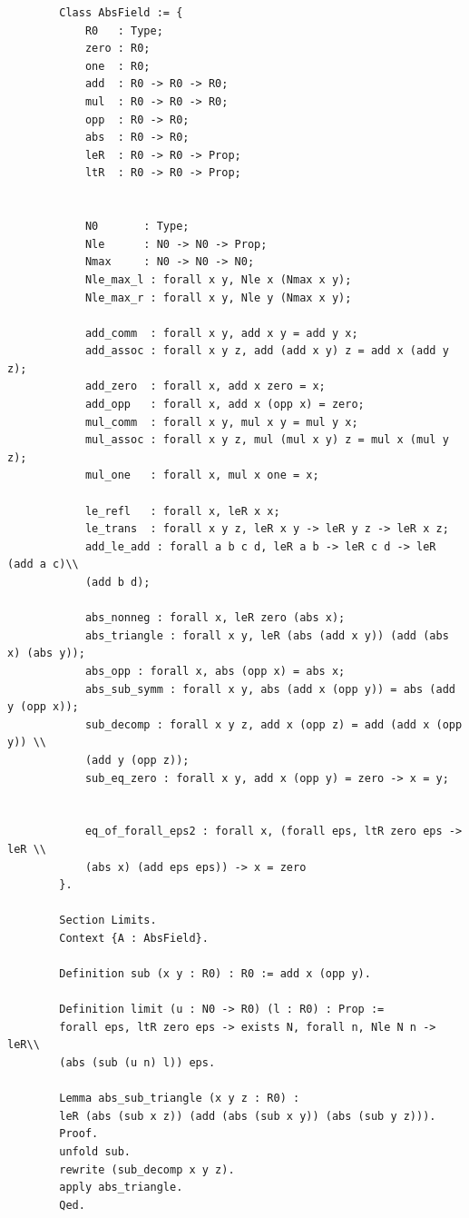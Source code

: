 \documentclass{article}
\theoremstyle{plain}
\theoremstyle{definition}
\theoremstyle{remark}
\begin{document}
	\begin{verbatim}
		Class AbsField := {
			R0   : Type;
			zero : R0;
			one  : R0;
			add  : R0 -> R0 -> R0;
			mul  : R0 -> R0 -> R0;
			opp  : R0 -> R0;
			abs  : R0 -> R0;
			leR  : R0 -> R0 -> Prop;
			ltR  : R0 -> R0 -> Prop;
			
			
			N0       : Type;
			Nle      : N0 -> N0 -> Prop;
			Nmax     : N0 -> N0 -> N0;
			Nle_max_l : forall x y, Nle x (Nmax x y);
			Nle_max_r : forall x y, Nle y (Nmax x y);
			
			add_comm  : forall x y, add x y = add y x;
			add_assoc : forall x y z, add (add x y) z = add x (add y z);
			add_zero  : forall x, add x zero = x;
			add_opp   : forall x, add x (opp x) = zero;
			mul_comm  : forall x y, mul x y = mul y x;
			mul_assoc : forall x y z, mul (mul x y) z = mul x (mul y z);
			mul_one   : forall x, mul x one = x;
			
			le_refl   : forall x, leR x x;
			le_trans  : forall x y z, leR x y -> leR y z -> leR x z;
			add_le_add : forall a b c d, leR a b -> leR c d -> leR (add a c)\\
			(add b d);
			
			abs_nonneg : forall x, leR zero (abs x);
			abs_triangle : forall x y, leR (abs (add x y)) (add (abs x) (abs y));
			abs_opp : forall x, abs (opp x) = abs x;
			abs_sub_symm : forall x y, abs (add x (opp y)) = abs (add y (opp x));
			sub_decomp : forall x y z, add x (opp z) = add (add x (opp y)) \\
			(add y (opp z));
			sub_eq_zero : forall x y, add x (opp y) = zero -> x = y;
			
			
			eq_of_forall_eps2 : forall x, (forall eps, ltR zero eps -> leR \\
			(abs x) (add eps eps)) -> x = zero
		}.
		
		Section Limits.
		Context {A : AbsField}.
		
		Definition sub (x y : R0) : R0 := add x (opp y).
		
		Definition limit (u : N0 -> R0) (l : R0) : Prop :=
		forall eps, ltR zero eps -> exists N, forall n, Nle N n -> leR\\
		(abs (sub (u n) l)) eps.
		
		Lemma abs_sub_triangle (x y z : R0) :
		leR (abs (sub x z)) (add (abs (sub x y)) (abs (sub y z))).
		Proof.
		unfold sub.
		rewrite (sub_decomp x y z).
		apply abs_triangle.
		Qed.
		

\end{verbatim}
\end{document}
